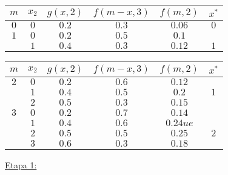 \documentclass[twoside]{article}
\begin{document}
\begin{solucion}
\begin{itemize}
\begin{center}
\begin{tabular}{|c| c| c| c | c| c|}
\hline
$m$ & $x_2$ & $g(x,2)$ & $f(m-x,3)$ &  $f(m,2)$ & $x^* $ \\
\hline
$0$ & $0$ & $0.2$ & $0.3$  & $0.06$& $\boxed{0}$\\
\hline
\hline
$1$ & $0$ & $0.2$ & $0.5$  & $0.1$& \\
\hline
 & $1$ & $0.4$ &$0.3$ & $0.12$ &$\boxed{1}$\\
\hline
\end{tabular} \qquad
\begin{tabular}{|c| c| c| c | c| c|}
\hline
$m$ & $x_2$ & $g(x,2)$ & $f(m-x,3)$ &  $f(m,2)$ & $x^* $ \\
\hline
$2$ & $0$ & $0.2$ & $0.6$  & $0.12$& \\
\hline
 & $1$    & $0.4$ &$0.5$ & $0.2$ &$\boxed{1}$\\
\hline
 & $2$    & $0.5$ &$0.3$ & $0.15$ &\\
\hline
\hline
$3$ & $0$ & $0.2$  & $0.7$  & $0.14$ & \\
\hline            
 & $1$    & $0.4$  &$0.6$ & $0.24ue$ &\\
\hline            
 & $2$    & $0.5$  &$0.5$ & $0.25$ &$\boxed{2}$\\
\hline
 & $3$ & $0.6$ & $0.3$ & $0.18$&\\
 \hline
\end{tabular}
\end{center}

\underline{Etapa 1:} 
\begin{center}


\end{center}
\end{itemize}
\end{solucion}
\end{document}
